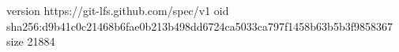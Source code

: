 version https://git-lfs.github.com/spec/v1
oid sha256:d9b41c0c21468b6fae0b213b498dd6724ca5033ca797f1458b63b5b3f9858367
size 21884
